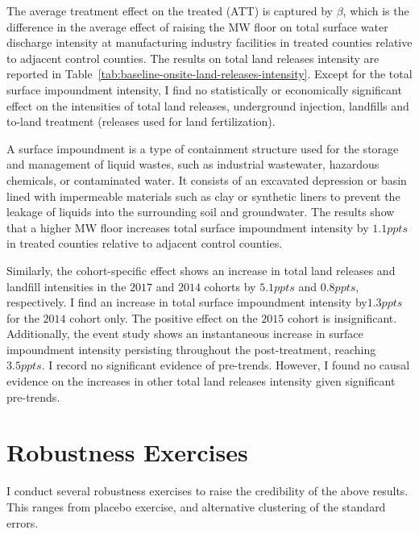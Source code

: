 \documentclass{C:/Users/david/OneDrive/Documents/ULMS/PhD/Thesis/chapter3/src/climate_change/latex/Economic_Journal/OUP-EJ}
\begin{document}
    The average treatment effect on the treated (ATT) is captured by $\beta$, which is the difference in the average effect of raising the MW floor on total surface water discharge intensity at manufacturing industry facilities in treated counties relative to adjacent control counties. The results on total land releases intensity are reported in Table~\ref{tab:baseline-onsite-land-releases-intensity}. Except for the total surface impoundment intensity, I find no statistically or economically significant effect on the intensities of total land releases, underground injection, landfills and to-land treatment (releases used for land fertilization).

    A surface impoundment is a type of containment structure used for the storage and management of liquid wastes, such as industrial wastewater, hazardous chemicals, or contaminated water. It consists of an excavated depression or basin lined with impermeable materials such as clay or synthetic liners to prevent the leakage of liquids into the surrounding soil and groundwater. The results show that a higher MW floor increases total surface impoundment intensity by $1.1ppts$ in treated counties relative to adjacent control counties.

    Similarly, the cohort-specific effect shows an increase in total land releases and landfill intensities in the $2017$ and $2014$ cohorts by $5.1ppts$ and $0.8ppts$, respectively. I find an increase in total surface impoundment intensity by$1.3ppts$ for the $2014$ cohort only. The positive effect on the $2015$ cohort is insignificant. Additionally, the event study shows an instantaneous increase in surface impoundment intensity persisting throughout the post-treatment, reaching $3.5ppts$. I record no significant evidence of pre-trends. However, I found no causal evidence on the increases in other total land releases intensity given significant pre-trends.
    


    \section{Robustness Exercises}\label{sec:robustness-exercises}
    I conduct several robustness exercises to raise the credibility of the above results. This ranges from placebo exercise, and alternative clustering of the standard errors.
\end{document}

